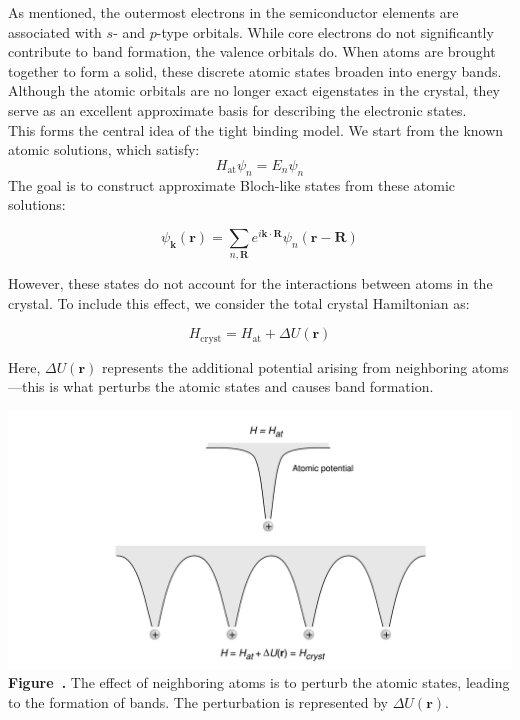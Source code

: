 As mentioned, the outermost electrons in the semiconductor elements are associated with $s$- and $p$-type orbitals. While core electrons do not significantly contribute to band formation, the valence orbitals do. When atoms are brought together to form a solid, these discrete atomic states broaden into energy bands. Although the atomic orbitals are no longer exact eigenstates in the crystal, they serve as an excellent approximate basis for describing the electronic states.\\
This forms the central idea of the tight binding model. We start from the known atomic solutions, which satisfy:
\begin{equation*}
	H_\text{at} \psi_n = E_n \psi_n
\end{equation*}
The goal is to construct approximate Bloch-like states from these atomic solutions:

\begin{equation*}
	\psi_{\mathbf{k}}(\mathbf{r}) = \sum_{n,\mathbf{R}} e^{i\mathbf{k} \cdot \mathbf{R}} \psi_n(\mathbf{r} - \mathbf{R})
\end{equation*}

However, these states do not account for the interactions between atoms in the crystal. To include this effect, we consider the total crystal Hamiltonian as:

\begin{equation*}
	H_\text{cryst} = H_\text{at} + \Delta U(\mathbf{r})
\end{equation*}

Here, \( \Delta U(\mathbf{r}) \) represents the additional potential arising from neighboring atoms—this is what perturbs the atomic states and causes band formation.
\begin{center}
	\begin{minipage}{0.9\textwidth}
		\centering
		\includegraphics[width=\textwidth]{img/neighboring_atoms.png}
		\\[0.5em]
		\textbf{Figure~\thefigure.} The effect of neighboring atoms is to perturb the atomic states, leading to the formation of bands. The perturbation is represented by \( \Delta U(\mathbf{r}) \).
		\label{fig:neighboring_atoms}
	\end{minipage}
\end{center}

